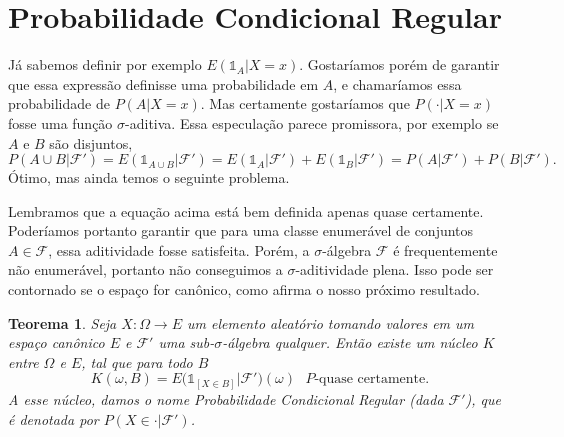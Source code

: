 \documentclass[reqno]{article}
\newcommand*\1{\mathds{1}}
\newtheorem{theorem}{Teorema}[section]
\begin{document}
\section{Probabilidade Condicional Regular}

Já sabemos definir por exemplo $E(\1_A|X = x)$.
Gostaríamos porém de garantir que essa expressão definisse uma probabilidade em $A$, e chamaríamos essa probabilidade de $P(A|X = x)$.
Mas certamente gostaríamos que $P(\cdot|X = x)$ fosse uma função $\sigma$-aditiva.
Essa especulação parece promissora, por exemplo se $A$ e $B$ são disjuntos,
\begin{equation*}
  P(A \cup B |\mathcal{F}') = E(\1_{A \cup B} | \mathcal{F}') = E(\1_A|\mathcal{F}') + E(\1_{B}|\mathcal{F}') = P(A|\mathcal{F}') + P(B|\mathcal{F}').
\end{equation*}
Ótimo, mas ainda temos o seguinte problema.

Lembramos que a equação acima está bem definida apenas quase certamente.
Poderíamos portanto garantir que para uma classe enumerável de conjuntos $A \in \mathcal{F}$, essa aditividade fosse satisfeita.
Porém, a $\sigma$-álgebra $\mathcal{F}$ é frequentemente não enumerável, portanto não conseguimos a $\sigma$-aditividade plena.
Isso pode ser contornado se o espaço for canônico, como afirma o nosso próximo resultado.

\begin{theorem}
  \label{t:prob_cond_reg_F}
  Seja $X: \Omega \to E$ um elemento aleatório tomando valores em um espaço canônico $E$ e $\mathcal{F}'$ uma sub-$\sigma$-álgebra qualquer.
  Então existe um núcleo $K$ entre $\Omega$ e $E$, tal que para todo $B$
  \begin{equation}
    K(\omega, B) = E\big(\1_{[X \in B]} | \mathcal{F}'\big) (\omega) \text{ $P$-quase certamente.}
  \end{equation}
  A esse núcleo, damos o nome Probabilidade Condicional Regular (dada $\mathcal{F}'$), que é denotada por $P(X \in \cdot|\mathcal{F}')$.
\end{theorem}
\end{document}
